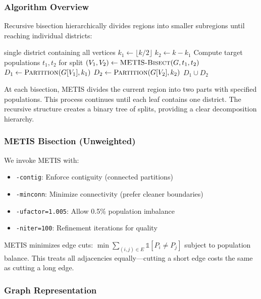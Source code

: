\subsubsection{Algorithm Overview}

Recursive bisection hierarchically divides regions into smaller subregions until reaching individual districts:

\begin{algorithm}[H]
\caption{Baseline Recursive Bisection}
\begin{algorithmic}[1]
        \State \Return single district containing all vertices
    \EndIf
    \State $k_1 \gets \lfloor k/2 \rfloor$
    \State $k_2 \gets k - k_1$
    \State Compute target populations $t_1, t_2$ for split
    \State $(V_1, V_2) \gets \Call{METIS-Bisect}{G, t_1, t_2}$
    \State $D_1 \gets \Call{Partition}{G[V_1], k_1}$
    \State $D_2 \gets \Call{Partition}{G[V_2], k_2}$
    \State \Return $D_1 \cup D_2$
\EndFunction
\end{algorithmic}
\end{algorithm}

At each bisection, METIS divides the current region into two parts with specified populations. This process continues until each leaf contains one district. The recursive structure creates a binary tree of splits, providing a clear decomposition hierarchy.

\subsubsection{METIS Bisection (Unweighted)}

We invoke METIS with:
\begin{itemize}
\item \texttt{-contig}: Enforce contiguity (connected partitions)
\item \texttt{-minconn}: Minimize connectivity (prefer cleaner boundaries)
\item \texttt{-ufactor=1.005}: Allow 0.5\% population imbalance
\item \texttt{-niter=100}: Refinement iterations for quality
\end{itemize}

METIS minimizes edge cuts: $\min \sum_{(i,j) \in E} \mathbb{1}[P_i \neq P_j]$ subject to population balance. This treats all adjacencies equally—cutting a short edge costs the same as cutting a long edge.

\subsubsection{Graph Representation}


